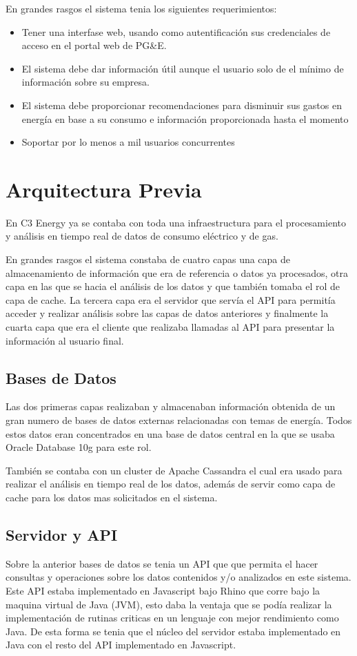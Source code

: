 \documentclass{article}
\begin{document}
En grandes rasgos el sistema tenia los siguientes requerimientos:
\begin{itemize}
\item Tener una interfase web, usando como autentificación
  sus credenciales de acceso en el portal web de PG\&E.
\item El sistema debe dar información útil aunque el usuario solo de
  el mínimo de información sobre su empresa.
\item El sistema debe proporcionar recomendaciones para disminuir sus
  gastos en energía en base a su consumo e información proporcionada
  hasta el momento
\item Soportar por lo menos a mil usuarios concurrentes
\end{itemize}

\section{Arquitectura Previa}
En C3 Energy ya se contaba con toda una infraestructura para el
procesamiento y análisis en tiempo real de datos de consumo eléctrico
y de gas.

En grandes rasgos el sistema constaba de cuatro capas una capa de
almacenamiento de información que era de referencia o datos ya
procesados, otra capa en las que se hacia el análisis de los datos
y que también tomaba el rol de capa de cache. La tercera capa era el
servidor que servía el API para permitía acceder y realizar análisis
sobre las capas de datos anteriores y finalmente la cuarta capa que
era el cliente que realizaba llamadas al API para presentar la
información al usuario final.

\subsection{Bases de Datos}
Las dos primeras capas realizaban y almacenaban información obtenida
de un gran numero de bases de datos externas relacionadas con temas
de energía. Todos estos datos eran concentrados en una base de datos
central en la que se usaba Oracle Database 10g para este rol.

También se contaba con un cluster de Apache Cassandra el cual era usado
para realizar el análisis en tiempo real de los datos, además de servir
como capa de cache para los datos mas solicitados en el sistema.

\subsection{Servidor y API}
Sobre la anterior bases de datos se tenia un API que que permita el
hacer consultas y operaciones sobre los datos contenidos y/o analizados
en este sistema. Este API estaba implementado en Javascript bajo Rhino
que corre bajo la maquina virtual de Java (JVM), esto daba la ventaja
que se podía realizar la implementación de rutinas criticas en un
lenguaje con mejor rendimiento como Java. De esta forma se tenia que el
núcleo del servidor estaba implementado en Java con el resto del API
implementado en Javascript.
\end{document}
